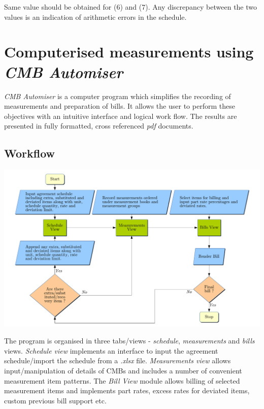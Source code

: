 \documentclass[twoside,a4paper]{refart}
\newenvironment{noteblock}[1]%
{\begin{mdframed}[topline=false,bottomline=false, rightline=false,
		linewidth=2pt, frametitle={#1}]}%
		{\end{mdframed}}
\begin{document}
	 \begin{noteblock}{Note:}
	 	Same value should be obtained for (6) and (7). Any discrepancy between the two values is an indication of arithmetic errors in the schedule.
	 \end{noteblock}
	 
	 \section{Computerised measurements using \emph{CMB Automiser}}
	 \emph{CMB Automiser} is a computer program which simplifies the recording of measurements and preparation of bills. It allows the user to perform these objectives with an intuitive interface and logical work flow. The results are presented in fully formatted, cross referenced \emph{pdf} documents.
	 
	 \subsection{Workflow}
	 
	 \begin{maxipage}
	 	\begin{center}
	 		\includegraphics[width=1\linewidth]{figures/workflow.pdf}
	 	\end{center}
	 \end{maxipage}
	 
	 The program is organised in three tabs/views - \emph{schedule}, \emph{measurements} and \emph{bills} views. \emph{Schedule view} implements an interface to input the agreement schedule/import the schedule from a \emph{.xlsx} file. \emph{Measurements view} allows input/manipulation of details of CMBs and includes a number of convenient measurement item patterns. The \emph{Bill View} module allows billing of selected measurement items and implements part rates, excess rates for deviated items, custom previous bill support etc.
	 
\end{document}
